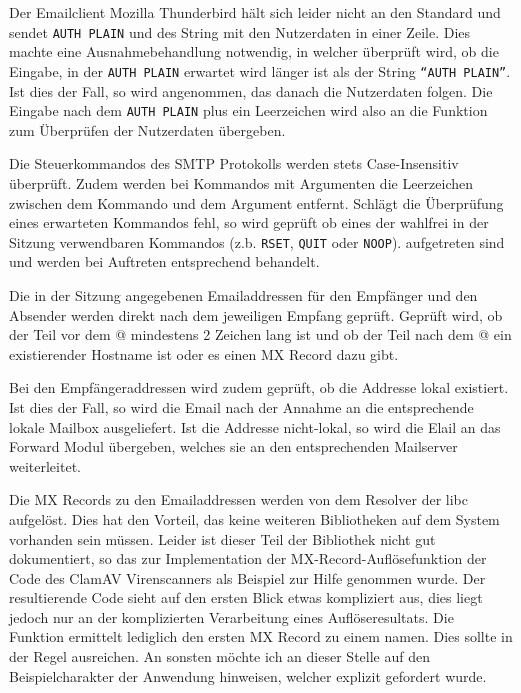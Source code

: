 \documentclass[final,a4paper,11pt,notitlepage,halfparskip]{scrreprt}
\begin{document}
Der Emailclient Mozilla Thunderbird hält sich leider nicht an den Standard und
sendet \texttt{AUTH PLAIN} und des String mit den Nutzerdaten in einer Zeile.
Dies machte eine Ausnahmebehandlung notwendig, in welcher überprüft wird, ob die
Eingabe, in der \texttt{AUTH PLAIN} erwartet wird länger ist als der String
\texttt{"`AUTH PLAIN"'}. Ist dies der Fall, so wird angenommen, das danach die
Nutzerdaten folgen. Die Eingabe nach dem \texttt{AUTH PLAIN} plus ein
Leerzeichen wird also an die Funktion zum Überprüfen der Nutzerdaten übergeben.

Die Steuerkommandos des SMTP Protokolls werden stets Case-Insensitiv überprüft.
Zudem werden bei Kommandos mit Argumenten die Leerzeichen zwischen dem Kommando
und dem Argument entfernt. Schlägt die Überprüfung eines erwarteten Kommandos
fehl, so wird geprüft ob eines der wahlfrei in der Sitzung verwendbaren
Kommandos (z.b. \texttt{RSET}, \texttt{QUIT} oder \texttt{NOOP}). aufgetreten
sind und werden bei Auftreten entsprechend behandelt.

Die in der Sitzung angegebenen Emailaddressen für den Empfänger und den Absender
werden direkt nach dem jeweiligen Empfang geprüft. Geprüft wird, ob der Teil vor
dem @ mindestens 2 Zeichen lang ist und ob der Teil nach dem @ ein existierender
Hostname ist oder es einen MX Record dazu gibt. 

Bei den Empfängeraddressen wird zudem geprüft, ob die Addresse lokal existiert.
Ist dies der Fall, so wird die Email nach der Annahme an die entsprechende
lokale Mailbox ausgeliefert. Ist die Addresse nicht-lokal, so wird die Elail an
das Forward Modul übergeben, welches sie an den entsprechenden Mailserver
weiterleitet.

Die MX Records zu den Emailaddressen werden von dem Resolver der libc aufgelöst.
Dies hat den Vorteil, das keine weiteren Bibliotheken auf dem System vorhanden
sein müssen. Leider ist dieser Teil der Bibliothek nicht gut dokumentiert, so
das zur Implementation der MX-Record-Auflösefunktion der Code des ClamAV
Virenscanners als Beispiel zur Hilfe genommen wurde. Der resultierende Code
sieht auf den ersten Blick etwas kompliziert aus, dies liegt jedoch nur an der
komplizierten Verarbeitung eines Auflöseresultats. Die Funktion ermittelt
lediglich den ersten MX Record zu einem namen. Dies sollte in der Regel
ausreichen. An sonsten möchte ich an dieser Stelle auf den Beispielcharakter der
Anwendung hinweisen, welcher explizit gefordert wurde.
\end{document}
